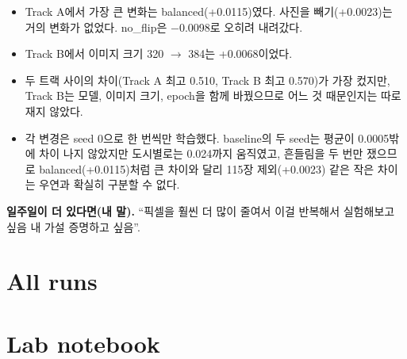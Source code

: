\documentclass[11pt]{article}
\begin{document}
\begin{itemize}
  \item Track A에서 가장 큰 변화는 balanced(+0.0115)였다. 사진을 빼기(+0.0023)는 거의 변화가 없었다. no\_flip은 $-$0.0098로 오히려 내려갔다.
  \item Track B에서 이미지 크기 320 $\to$ 384는 +0.0068이었다.
  \item 두 트랙 사이의 차이(Track A 최고 0.510, Track B 최고 0.570)가 가장 컸지만, Track B는 모델, 이미지 크기, epoch을 함께 바꿨으므로 어느 것 때문인지는 따로 재지 않았다.
  \item 각 변경은 seed 0으로 한 번씩만 학습했다. baseline의 두 seed는 평균이 0.0005밖에 차이 나지 않았지만 도시별로는 0.024까지 움직였고, 흔들림을 두 번만 쟀으므로 balanced(+0.0115)처럼 큰 차이와 달리 115장 제외(+0.0023) 같은 작은 차이는 우연과 확실히 구분할 수 없다.
\end{itemize}

\textbf{일주일이 더 있다면(내 말).} ``픽셀을 훨씬 더 많이 줄여서 이걸 반복해서 실험해보고 싶음 내 가설 증명하고 싶음''.

\section*{All runs}

\section*{Lab notebook}
\end{document}
